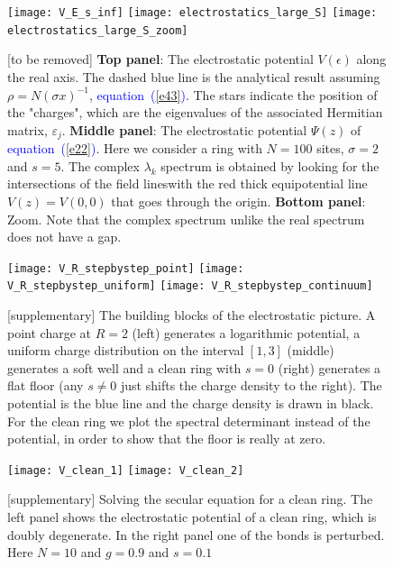 \documentclass[aps,pre,floats,floatfix,twocolumn]{revtex4}
\newcommand{\Eq}[1]{\textcolor{blue}{{equation}\!~(\ref{#1})}}
\newcommand{\rmrk}[1]{{\color[rgb]{0.6,0,0.1} #1}}
\begin{document}
\begin{figure}
\texttt{[image: V\_E\_s\_inf]}
\texttt{[image: electrostatics\_large\_S]}
\texttt{[image: electrostatics\_large\_S\_zoom]}

\caption{\label{figWeak} \rmrk{[to be removed]}
%
{\bf Top panel}: 
The electrostatic potential $V(\epsilon)$ along the real axis. 
The dashed blue line is the analytical result assuming $\rho=N(\sigma x)^{-1}$, \Eq{e43}. 
The stars indicate the position of the "charges", 
which are the eigenvalues of the associated Hermitian matrix, $\varepsilon_j$.
%
{\bf Middle panel}: 
The electrostatic potential $\Psi(z)$ of \Eq{e22}. 
Here we consider a ring with $N=100$ sites, $\sigma=2$ and $s=5$. 
The complex $\lambda_k$ spectrum is obtained by looking 
for the intersections of the field lineswith the red thick 
equipotential line $V(z)=V(0,0)$ that goes through the origin. 
%
{\bf Bottom panel}: Zoom. 
Note that the complex spectrum unlike the real spectrum does not have a gap.
}

\end{figure}



\begin{figure}[h!]
\texttt{[image: V\_R\_stepbystep\_point]}
\texttt{[image: V\_R\_stepbystep\_uniform]}
\texttt{[image: V\_R\_stepbystep\_continuum]}

\caption{\label{stepByStep}\rmrk{[supplementary]}
The building blocks of the electrostatic picture. 
A point charge at $R=2$ (left) generates a logarithmic potential, 
a uniform charge distribution on the interval $[1,3]$ (middle) generates a soft well
and a clean ring with $s=0$ (right) generates a flat floor (any $s\neq 0$ just shifts the charge density to the right). 
The potential is the blue line and the charge density is drawn in black.
For the clean ring we plot the spectral determinant instead of the potential, in order to show that the floor is really at zero.
}
\end{figure}



\begin{figure}
\texttt{[image: V\_clean\_1]}
\texttt{[image: V\_clean\_2]}

\caption{\label{figClean}\rmrk{[supplementary]}
Solving the secular equation for a clean ring. 
The left panel shows the electrostatic potential of a clean ring, which is doubly degenerate. 
In the right panel one of the bonds is perturbed. Here $N=10$ and $g=0.9$ and $s=0.1$
}
\end{figure}
\end{document}
